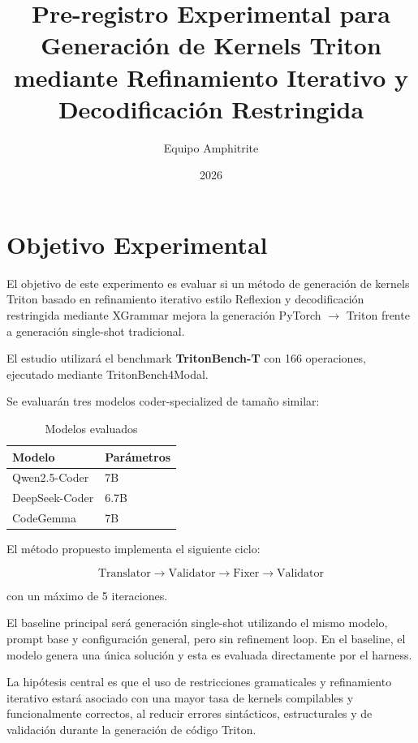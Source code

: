 \documentclass[12pt]{article}
\title{Pre-registro Experimental para Generación de Kernels Triton mediante Refinamiento Iterativo y Decodificación Restringida}
\author{Equipo Amphitrite}
\date{2026}
\begin{document}
\maketitle

\tableofcontents
\newpage

\section{Objetivo Experimental}

El objetivo de este experimento es evaluar si un método de generación de kernels Triton basado en refinamiento iterativo estilo Reflexion y decodificación restringida mediante XGrammar mejora la generación PyTorch $\rightarrow$ Triton frente a generación single-shot tradicional.

El estudio utilizará el benchmark \textbf{TritonBench-T} con 166 operaciones, ejecutado mediante TritonBench4Modal.

Se evaluarán tres modelos coder-specialized de tamaño similar:

\begin{table}[H]
\centering
\begin{tabular}{p{} p{}}
\toprule
\textbf{Modelo} & \textbf{Parámetros} \\
\midrule
Qwen2.5-Coder & 7B \\
DeepSeek-Coder & 6.7B \\
CodeGemma & 7B \\
\bottomrule
\end{tabular}
\caption{Modelos evaluados}
\end{table}

El método propuesto implementa el siguiente ciclo:

\[
\text{Translator} \rightarrow \text{Validator} \rightarrow \text{Fixer} \rightarrow \text{Validator}
\]

con un máximo de 5 iteraciones.

El baseline principal será generación single-shot utilizando el mismo modelo, prompt base y configuración general, pero sin refinement loop. En el baseline, el modelo genera una única solución y esta es evaluada directamente por el harness.

La hipótesis central es que el uso de restricciones gramaticales y refinamiento iterativo estará asociado con una mayor tasa de kernels compilables y funcionalmente correctos, al reducir errores sintácticos, estructurales y de validación durante la generación de código Triton.
\end{document}
